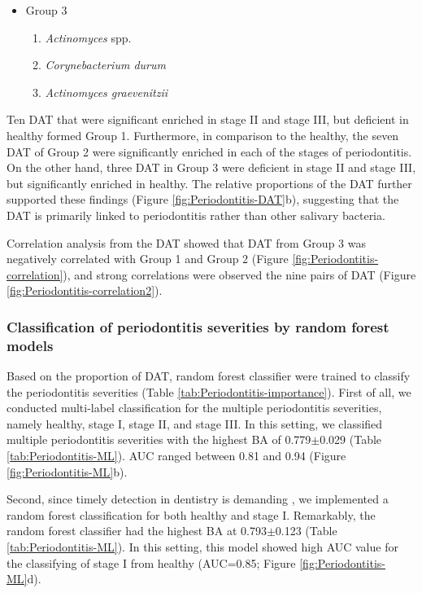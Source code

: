 \documentclass[11pt, a4paper, onecolumn, oneside]{report}
\begin{document}
\begin{itemize}
                    \item Group 3
                    \begin{enumerate}
                        \item \textit{Actinomyces} spp.
                        \item \textit{Corynebacterium durum}
                        \item \textit{Actinomyces graevenitzii}
                    \end{enumerate}
                \end{itemize}

                Ten DAT that were significant enriched in stage II and stage III, but deficient in healthy formed Group 1. Furthermore, in comparison to the healthy, the seven DAT of Group 2 were significantly enriched in each of the stages of periodontitis. On the other hand, three DAT in Group 3 were deficient in stage II and stage III, but significantly enriched in healthy. The relative proportions of the DAT further supported these findings (Figure \ref{fig:Periodontitis-DAT}b), suggesting that the DAT is primarily linked to periodontitis rather than other salivary bacteria.

                Correlation analysis from the DAT showed that DAT from Group 3 was negatively correlated with Group 1 and Group 2 (Figure \ref{fig:Periodontitis-correlation}), and strong correlations were observed the nine pairs of DAT (Figure \ref{fig:Periodontitis-correlation2}).

            \subsubsection{Classification of periodontitis severities by random forest models}
                Based on the proportion of DAT, random forest classifier were trained to classify the periodontitis severities (Table \ref{tab:Periodontitis-importance}). First of all, we conducted multi-label classification for the multiple periodontitis severities, namely healthy, stage I, stage II, and stage III. In this setting, we classified multiple periodontitis severities with the highest BA of 0.779$\pm$0.029 (Table \ref{tab:Periodontitis-ML}). AUC ranged between 0.81 and 0.94 (Figure \ref{fig:Periodontitis-ML}b).

                Second, since timely detection in dentistry is demanding \cite{Periodontitis-5}, we implemented a random forest classification for both healthy and stage I. Remarkably, the random forest classifier had the highest BA at 0.793$\pm$0.123 (Table \ref{tab:Periodontitis-ML}). In this setting, this model showed high AUC value for the classifying of stage I from healthy (AUC=0.85; Figure \ref{fig:Periodontitis-ML}d).
\end{document}
